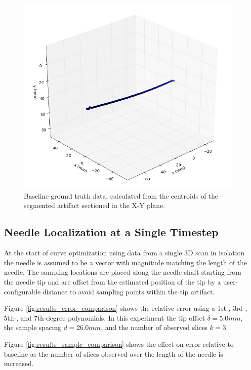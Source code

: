 \begin{figure}[h]
\includegraphics[width=1.0\textwidth]{Fig/chap5/neutral_axis_2001_b.png}
\caption{Baseline ground truth data, calculated from the centroids of the segmented artifact sectioned in the X-Y plane.}
\label{fig:ground_truth_2001}
\end{figure}

\subsection{Needle Localization at a Single Timestep}
\label{sec:mri_single_timestep}
At the start of curve optimization using data from a single 3D scan in isolation the needle is assumed to be a vector with magnitude matching the length of the needle. The sampling locations are placed along the needle shaft starting from the needle tip and are offset from the estimated position of the tip by a user-configurable distance to avoid sampling points within the tip artifact.

Figure \ref{fig:results_error_comparison} shows the relative error using a 1st-, 3rd-, 5th-, and 7th-degree polynomials. In this experiment the tip offset $\delta=5.0mm$, the sample spacing $d=26.0mm$, and the number of observed slices $k=3$. 

Figure \ref{fig:results_sample_comparison} shows the effect on error relative to baseline as the number of slices observed over the length of the needle is increased. 


